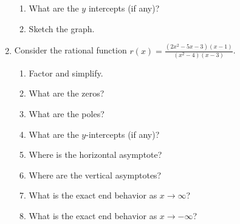 \documentclass[letterpaper,12pt,fleqn]{article}
\begin{document}
\begin{enumerate}
\begin{enumerate}
  \item What are the $y$ intercepts (if any)?

    \vspace{1in}

  \item Sketch the graph.

    \bigskip

    \begin{figure}[h]
      \setlength{\leftskip}{1in}
    \end{figure}
  \end{enumerate}

  \newpage

\item Consider the rational function
  $r(x)=\frac{(2x^2-5x-3)(x-1)}{(x^2-4)(x-3)}$.
  \begin{enumerate}
  \item Factor and simplify.

    \vspace{3in}
    
  \item What are the zeros?

    \vspace{0.5in}
    
  \item What are the poles?

    \vspace{0.5in}

  \item What are the $y$-intercepts (if any)?

    \vspace{1in}

  \item Where is the horizontal asymptote?

    \vspace{0.5in}

  \item Where are the vertical asymptotes?

    \newpage

  \item What is the exact end behavior as $x\to\infty$?

    \vspace{4in}

  \item What is the exact end behavior as $x\to-\infty$?


\end{enumerate}
\end{enumerate}
\end{document}
